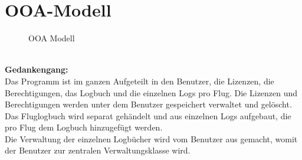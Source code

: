 \documentclass[a4paper]{article} %
\begin{document}
    \pagebreak

    \section{OOA-Modell}
    \begin{figure}[h!]
        \centering
        \caption{OOA Modell}
        \label{fig:my_label}
    \end{figure}
    \pagebreak
    \noindent\\
    \noindent \textbf{Gedankengang:}\\
    
    \noindent Das Programm ist im ganzen Aufgeteilt in den Benutzer, die Lizenzen, die Berechtigungen, das Logbuch und die einzelnen Logs pro Flug. Die Lizenzen und Berechtigungen werden unter dem Benutzer gespeichert verwaltet und gelöscht. Das Fluglogbuch wird separat gehändelt und aus einzelnen Logs aufgebaut, die pro Flug dem Logbuch hinzugefügt werden.\\ Die Verwaltung der einzelnen Logbücher wird vom Benutzer aus gemacht, womit der Benutzer zur zentralen Verwaltungsklasse wird.
\end{document}
